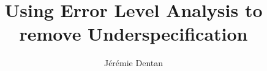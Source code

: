 \documentclass[sigconf, nonacm]{acmart}
\begin{document}
\title{Using Error Level Analysis to remove Underspecification}

\author{Jérémie Dentan}

\renewcommand{\shortauthors}{Dentan}
\end{document}
